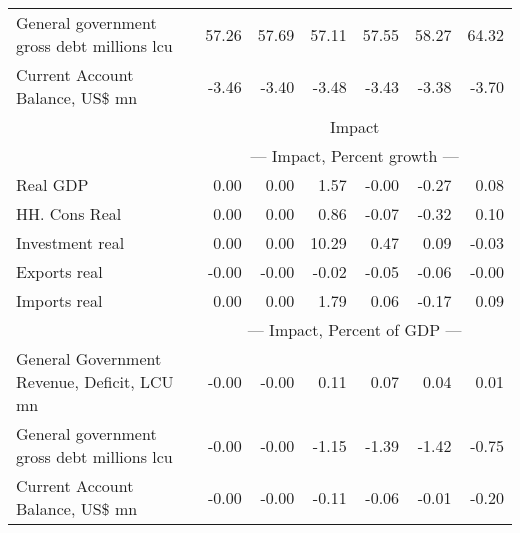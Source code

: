 \documentclass{article}
\begin{document}
\begin{table}[ht]
\begin{tabular}{lrrrrr|r}
General government gross debt millions lcu & 57.26 & 57.69 & 57.11 & 57.55 & 58.27 & 64.32 \\
Current Account Balance, US\$ mn & -3.46 & -3.40 & -3.48 & -3.43 & -3.38 & -3.70 \\
&\multicolumn{6}{c}{{Impact}}                               \\
&\multicolumn{6}{c}{{--- Impact, Percent growth ---}}                               \\
Real GDP & 0.00 & 0.00 & 1.57 & -0.00 & -0.27 & 0.08 \\
HH. Cons Real & 0.00 & 0.00 & 0.86 & -0.07 & -0.32 & 0.10 \\
Investment real & 0.00 & 0.00 & 10.29 & 0.47 & 0.09 & -0.03 \\
Exports real & -0.00 & -0.00 & -0.02 & -0.05 & -0.06 & -0.00 \\
Imports real & 0.00 & 0.00 & 1.79 & 0.06 & -0.17 & 0.09 \\
&\multicolumn{6}{c}{{--- Impact, Percent of GDP ---}}                               \\
General Government Revenue, Deficit, LCU mn & -0.00 & -0.00 & 0.11 & 0.07 & 0.04 & 0.01 \\
General government gross debt millions lcu & -0.00 & -0.00 & -1.15 & -1.39 & -1.42 & -0.75 \\
Current Account Balance, US\$ mn & -0.00 & -0.00 & -0.11 & -0.06 & -0.01 & -0.20 \\
\bottomrule
\end{tabular}
\end{table}
\end{document}
